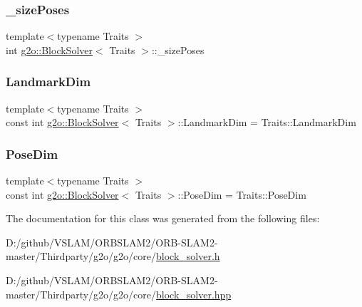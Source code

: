 \subsubsection{\texorpdfstring{\+\_\+size\+Poses}{\_sizePoses}}
{\footnotesize\ttfamily template$<$typename Traits $>$ \\
int \mbox{\hyperlink{classg2o_1_1_block_solver}{g2o\+::\+Block\+Solver}}$<$ Traits $>$\+::\+\_\+size\+Poses\hspace{0.3cm}{\ttfamily [protected]}}

\mbox{\label{classg2o_1_1_block_solver_a2d5e499f65a71985a8256e98c1608dd9}} 
\subsubsection{\texorpdfstring{Landmark\+Dim}{LandmarkDim}}
{\footnotesize\ttfamily template$<$typename Traits $>$ \\
const int \mbox{\hyperlink{classg2o_1_1_block_solver}{g2o\+::\+Block\+Solver}}$<$ Traits $>$\+::Landmark\+Dim = Traits\+::\+Landmark\+Dim\hspace{0.3cm}{\ttfamily [static]}}

\mbox{\label{classg2o_1_1_block_solver_a9a68f557c8e04cd76565fc45e1747e45}} 
\subsubsection{\texorpdfstring{Pose\+Dim}{PoseDim}}
{\footnotesize\ttfamily template$<$typename Traits $>$ \\
const int \mbox{\hyperlink{classg2o_1_1_block_solver}{g2o\+::\+Block\+Solver}}$<$ Traits $>$\+::Pose\+Dim = Traits\+::\+Pose\+Dim\hspace{0.3cm}{\ttfamily [static]}}



The documentation for this class was generated from the following files\+:\begin{DoxyCompactItemize}
\item 
D\+:/github/\+V\+S\+L\+A\+M/\+O\+R\+B\+S\+L\+A\+M2/\+O\+R\+B-\/\+S\+L\+A\+M2-\/master/\+Thirdparty/g2o/g2o/core/\mbox{\hyperlink{block__solver_8h}{block\+\_\+solver.\+h}}\item 
D\+:/github/\+V\+S\+L\+A\+M/\+O\+R\+B\+S\+L\+A\+M2/\+O\+R\+B-\/\+S\+L\+A\+M2-\/master/\+Thirdparty/g2o/g2o/core/\mbox{\hyperlink{block__solver_8hpp}{block\+\_\+solver.\+hpp}}\end{DoxyCompactItemize}
